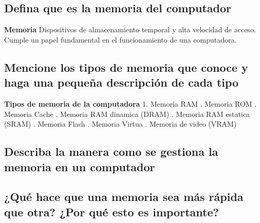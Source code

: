 \documentclass{article}
\begin{document}
\subsection{Defina que es la memoria del computador}


\begin{tcolorbox}[colupper=red!75!black]
	\textbf{Memoria}
	\tcblower
	Dispositivos de almacenamiento temporal y alta velocidad de acceso. Cumple un papel fundamental en el funcionamiento de una computadora.
\end{tcolorbox}

\subsection{Mencione los tipos de memoria que conoce y haga una pequeña descripción de cada tipo}

\begin{tcolorbox}[colupper=red!75!black]
	\textbf{Tipos de memoria de la computadora}
	1. Memoria RAM
	. Memoria ROM
	. Memoria Cache
	. Memoria RAM dinamica (DRAM)
	. Memoria RAM estatica (SRAM)
	. Memoria Flash
	. Memoria Virtua
	. Memoria de video (VRAM)
\end{tcolorbox}

\subsection{Describa la manera como se gestiona la memoria en un computador}

\begin{tcolorbox}[colupper=red!75!black]
	\textbf{}
	\tcblower
	
\end{tcolorbox}

\subsection{¿Qué hace que una memoria sea más rápida que otra? ¿Por qué esto es importante?}
\end{document}
